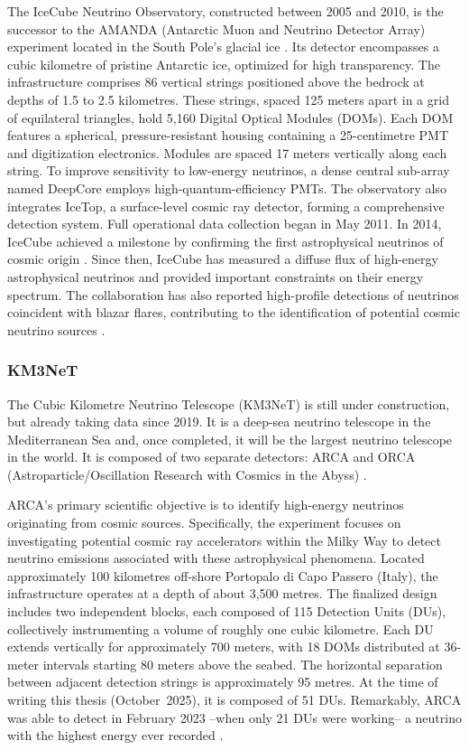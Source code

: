 The IceCube Neutrino Observatory, constructed between 2005 and 2010, is the successor to the AMANDA (Antarctic Muon and Neutrino Detector Array) experiment located in the South Pole’s glacial ice \cite{IceCube}. Its detector encompasses a cubic kilometre of pristine Antarctic ice, optimized for high transparency. The infrastructure comprises 86 vertical strings positioned above the bedrock at depths of 1.5 to 2.5 kilometres. These strings, spaced 125 meters apart in a grid of equilateral triangles, hold 5,160 Digital Optical Modules (DOMs). Each DOM features a spherical, pressure-resistant housing containing a 25-centimetre PMT and digitization electronics. Modules are spaced 17 meters vertically along each string. To improve sensitivity to low-energy neutrinos, a dense central sub-array named DeepCore employs high-quantum-efficiency PMTs. The observatory also integrates IceTop, a surface-level cosmic ray detector, forming a comprehensive detection system. Full operational data collection began in May 2011. In 2014, IceCube achieved a milestone by confirming the first astrophysical neutrinos of cosmic origin \cite{ice}. Since then, IceCube has measured a diffuse flux of high-energy astrophysical neutrinos and provided important constraints on their energy spectrum. The collaboration has also reported high-profile detections of neutrinos coincident with blazar flares, contributing to the identification of potential cosmic neutrino sources \cite{iceblazar, icediffuse}.


\subsubsection*{KM3NeT}

The Cubic Kilometre Neutrino Telescope (KM3NeT) is still under construction, but already taking data since 2019. It is a deep-sea neutrino telescope in the Mediterranean Sea and, once completed, it will be the largest neutrino telescope in the world. It is composed of two separate detectors: ARCA and ORCA (Astroparticle/Oscillation Research with Cosmics in the Abyss) \cite{km3net1}.

ARCA’s primary scientific objective is to identify high-energy neutrinos originating from cosmic sources. Specifically, the experiment focuses on investigating potential cosmic ray accelerators within the Milky Way to detect neutrino emissions associated with these astrophysical phenomena. Located approximately 100 kilometres off-shore Portopalo di Capo Passero (Italy), the infrastructure operates at a depth of about 3,500 metres. The finalized design includes two independent blocks, each composed of 115 Detection Units (DUs), collectively instrumenting a volume of roughly one cubic kilometre. Each DU extends vertically for approximately 700 meters, with 18 DOMs distributed at 36-meter intervals starting 80 meters above the seabed. The horizontal separation between adjacent detection strings is approximately 95 metres. At the time of writing this thesis (October~2025), it is composed of 51 DUs. Remarkably, ARCA was able to detect in February 2023 --when only 21 DUs were working-- a neutrino with the highest energy ever recorded \cite{nature}.

